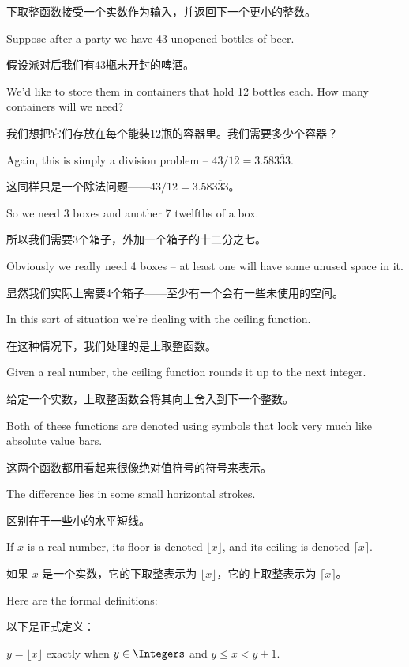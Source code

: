 下取整函数接受一个实数作为输入，并返回下一个更小的整数。

Suppose after a party we have 43 unopened bottles of beer.

假设派对后我们有43瓶未开封的啤酒。

We'd like
to store them in containers that hold 12 bottles each.  How many 
containers will we need?

我们想把它们存放在每个能装12瓶的容器里。我们需要多少个容器？

Again, this is simply a division problem --
$43/12 = 3.58\overline{333}$.

这同样只是一个除法问题——$43/12 = 3.58\overline{333}$。

So we need 3 boxes and another 
7 twelfths of a box.

所以我们需要3个箱子，外加一个箱子的十二分之七。

Obviously we really need 4 boxes -- at least one
will have some unused space in it.

显然我们实际上需要4个箱子——至少有一个会有一些未使用的空间。

In this sort of situation
we're dealing with the ceiling function.

在这种情况下，我们处理的是上取整函数。

Given a real number, the ceiling function rounds it up to the 
next integer.

给定一个实数，上取整函数会将其向上舍入到下一个整数。

Both of these functions are denoted using symbols that look very
much like absolute value bars.

这两个函数都用看起来很像绝对值符号的符号来表示。

The difference lies in some 
small horizontal strokes.

区别在于一些小的水平短线。

If $x$ is a real number, its floor is denoted $\lfloor x \rfloor$,
and its ceiling is denoted $\lceil x \rceil$.

如果 $x$ 是一个实数，它的下取整表示为 $\lfloor x \rfloor$，它的上取整表示为 $\lceil x \rceil$。

Here are the 
formal definitions:

以下是正式定义：

\begin{defi}
$y = \lfloor x \rfloor$ exactly when $y \in \Integers$ and 
$y \leq x < y+1$.
\end{defi}

